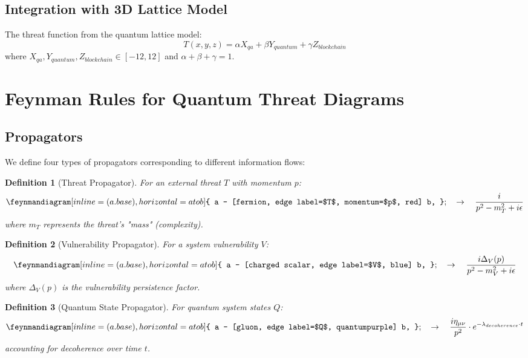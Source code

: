 \documentclass[11pt,a4paper]{article}
\newtheorem{definition}{Definition}
\begin{document}
\subsection{Integration with 3D Lattice Model}

The threat function from the quantum lattice model:
\begin{equation}
T(x,y,z) = \alpha X_{qa} + \beta Y_{quantum} + \gamma Z_{blockchain}
\end{equation}
where $X_{qa}, Y_{quantum}, Z_{blockchain} \in [-12, 12]$ and $\alpha + \beta + \gamma = 1$.

\section{Feynman Rules for Quantum Threat Diagrams}

\subsection{Propagators}

We define four types of propagators corresponding to different information flows:

\begin{definition}[Threat Propagator]
For an external threat $T$ with momentum $p$:
\begin{equation}
\feynmandiagram [inline=(a.base), horizontal=a to b] {
  a -- [fermion, edge label=$T$, momentum=$p$, red] b,
};
\quad \rightarrow \quad \frac{i}{p^2 - m_T^2 + i\epsilon}
\end{equation}
where $m_T$ represents the threat's "mass" (complexity).
\end{definition}

\begin{definition}[Vulnerability Propagator]
For a system vulnerability $V$:
\begin{equation}
\feynmandiagram [inline=(a.base), horizontal=a to b] {
  a -- [charged scalar, edge label=$V$, blue] b,
};
\quad \rightarrow \quad \frac{i\Delta_V(p)}{p^2 - m_V^2 + i\epsilon}
\end{equation}
where $\Delta_V(p)$ is the vulnerability persistence factor.
\end{definition}

\begin{definition}[Quantum State Propagator]
For quantum system states $Q$:
\begin{equation}
\feynmandiagram [inline=(a.base), horizontal=a to b] {
  a -- [gluon, edge label=$Q$, quantumpurple] b,
};
\quad \rightarrow \quad \frac{i\eta_{\mu\nu}}{p^2} \cdot e^{-\lambda_{decoherence} \cdot t}
\end{equation}
accounting for decoherence over time $t$.
\end{definition}
\end{document}
